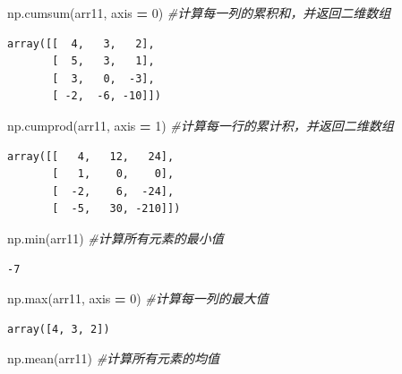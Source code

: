 \documentclass[]{article}
\newenvironment{Shaded}{\begin{snugshade}}{\end{snugshade}}
\newcommand{\DecValTok}[1]{\textcolor[rgb]{0.00,0.00,0.81}{#1}}
\newcommand{\CommentTok}[1]{\textcolor[rgb]{0.56,0.35,0.01}{\textit{#1}}}
\newcommand{\OperatorTok}[1]{\textcolor[rgb]{0.81,0.36,0.00}{\textbf{#1}}}
\newcommand{\BuiltInTok}[1]{#1}
\newcommand{\NormalTok}[1]{#1}
\begin{document}
\begin{Shaded}
\begin{Highlighting}[]
\NormalTok{np.cumsum(arr11, axis }\OperatorTok{=} \DecValTok{0}\NormalTok{) }\CommentTok{#计算每一列的累积和，并返回二维数组}
\end{Highlighting}
\end{Shaded}

\begin{verbatim}
array([[  4,   3,   2],
       [  5,   3,   1],
       [  3,   0,  -3],
       [ -2,  -6, -10]])
\end{verbatim}

\begin{Shaded}
\begin{Highlighting}[]
\NormalTok{np.cumprod(arr11, axis }\OperatorTok{=} \DecValTok{1}\NormalTok{) }\CommentTok{#计算每一行的累计积，并返回二维数组}
\end{Highlighting}
\end{Shaded}

\begin{verbatim}
array([[   4,   12,   24],
       [   1,    0,    0],
       [  -2,    6,  -24],
       [  -5,   30, -210]])
\end{verbatim}

\begin{Shaded}
\begin{Highlighting}[]
\NormalTok{np.}\BuiltInTok{min}\NormalTok{(arr11) }\CommentTok{#计算所有元素的最小值}
\end{Highlighting}
\end{Shaded}

\begin{verbatim}
-7
\end{verbatim}

\begin{Shaded}
\begin{Highlighting}[]
\NormalTok{np.}\BuiltInTok{max}\NormalTok{(arr11, axis }\OperatorTok{=} \DecValTok{0}\NormalTok{) }\CommentTok{#计算每一列的最大值}
\end{Highlighting}
\end{Shaded}

\begin{verbatim}
array([4, 3, 2])
\end{verbatim}

\begin{Shaded}
\begin{Highlighting}[]
\NormalTok{np.mean(arr11) }\CommentTok{#计算所有元素的均值}
\end{Highlighting}
\end{Shaded}
\end{document}
